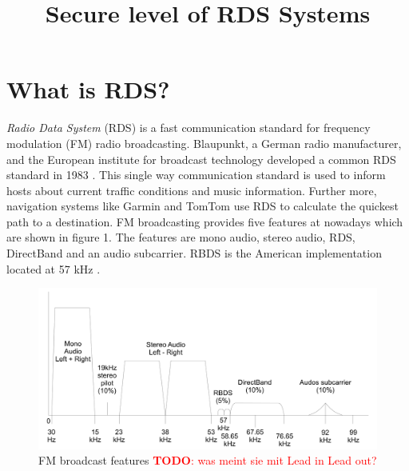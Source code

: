 \documentclass[conference,11pt,a4paper]{IEEEtran}
\newcommand{\todo}[1]{\textcolor{red}{\textbf{TODO}: #1}}
\begin{document}
	
		\title{Secure level of RDS Systems}
		\author{
		}
		\maketitle
		\thispagestyle{plain}
		\pagestyle{plain}

	
	\section{What is RDS?}
		\textit{Radio Data System} (RDS) is a fast communication standard for frequency modulation (FM) radio broadcasting. Blaupunkt, a German radio manufacturer, and the European institute for broadcast technology developed a common RDS standard in 1983 \cite{Grds}. This single way communication standard is used to inform hosts about current traffic conditions and music information. Further more, navigation systems like Garmin and TomTom use RDS to calculate the quickest path to a destination. FM broadcasting provides five features at nowadays which are shown in figure 1. The features are mono audio, stereo audio, RDS, DirectBand and an audio subcarrier. RBDS is the American implementation located at 57 kHz \cite{standard}.
		
		\begin{figure}[h]
			\centering
			\includegraphics[scale=0.13]{img/RDS_spectrum2}
			\caption{FM broadcast features \todo{was meint sie mit Lead in Lead out? }}
			\label{fig: spec}
		\end{figure}
	
\end{document}
